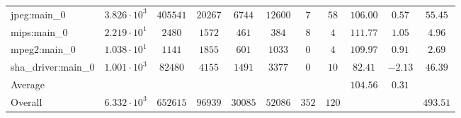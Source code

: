 \begin{tabular}{|l|c|c|c|c|c|c|c|c|c|c|}
jpeg:main\_0            & $ 3.826 \cdot 10^{3}  $ & $ 405541 $ & $ 20267 $ & $ 6744  $ & $ 12600 $ & $ 7   $ & $ 58  $ & $ 106.00      $ & $ 0.57    $ & $ 55.45   $ \\
mips:main\_0            & $ 2.219 \cdot 10^{1}  $ & $ 2480   $ & $ 1572  $ & $ 461   $ & $ 384   $ & $ 8   $ & $ 4   $ & $ 111.77      $ & $ 1.05    $ & $ 4.96    $ \\
mpeg2:main\_0           & $ 1.038 \cdot 10^{1}  $ & $ 1141   $ & $ 1855  $ & $ 601   $ & $ 1033  $ & $ 0   $ & $ 4   $ & $ 109.97      $ & $ 0.91    $ & $ 2.69    $ \\
sha\_driver:main\_0     & $ 1.001 \cdot 10^{3}  $ & $ 82480  $ & $ 4155  $ & $ 1491  $ & $ 3377  $ & $ 0   $ & $ 10  $ & $ 82.41       $ & $ -2.13   $ & $ 46.39   $ \\
\hline
Average                 & $                     $ & $        $ & $       $ & $       $ & $       $ & $     $ & $     $ & $ 104.56      $ & $ 0.31    $ & $         $ \\
\hline
Overall                 & $ 6.332 \cdot 10^{3}  $ & $ 652615 $ & $ 96939 $ & $ 30085 $ & $ 52086 $ & $ 352 $ & $ 120 $ & $             $ & $         $ & $ 493.51  $ \\
\hline
\end{tabular}

